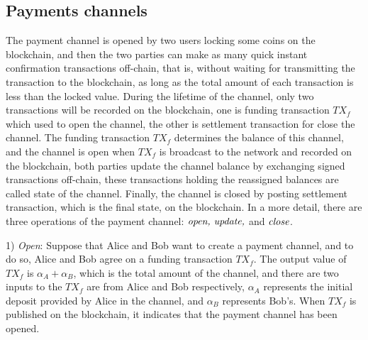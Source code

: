 \documentclass[conference]{IEEEtran}
\begin{document}
\subsection{Payments channels}
The payment channel is opened by two users locking some coins on the blockchain, and then the two parties can make as many 
quick instant confirmation transactions off-chain, that is, without waiting for transmitting the transaction to the blockchain, 
as long as the total amount of each transaction is less than the locked value. During the lifetime of the channel, only two 
transactions will be recorded on the blockchain, one is funding transaction $TX_f$ which used to open the channel, the other is 
settlement transaction for close the channel. The funding transaction $TX_f$ determines the balance of this channel, and the 
channel is open when $TX_f$ is broadcast to the network and recorded on the blockchain, both parties update the channel balance 
by exchanging signed transactions off-chain, these transactions holding the reassigned balances are called state of the channel. 
Finally, the channel is closed by posting settlement transaction, which is the final state, on the blockchain. In a more detail, 
there are three operations of the payment channel: $\emph{open, update,}$ and  $\emph{close}$.

1) \emph{Open}: Suppose that Alice and Bob want to create a payment channel, and to do so, Alice and Bob agree on a funding transaction 
$TX_f$. The output value of $TX_f$ is $\alpha_A+\alpha_B$, which is the total amount of the channel, and there are two inputs 
to the $TX_f$ are from Alice and Bob respectively, $\alpha_A$ represents the initial deposit provided by Alice in the channel, 
and $\alpha_B$ represents Bob's. When $TX_f$ is published on the blockchain, it indicates that the payment channel has been opened.
\end{document}
